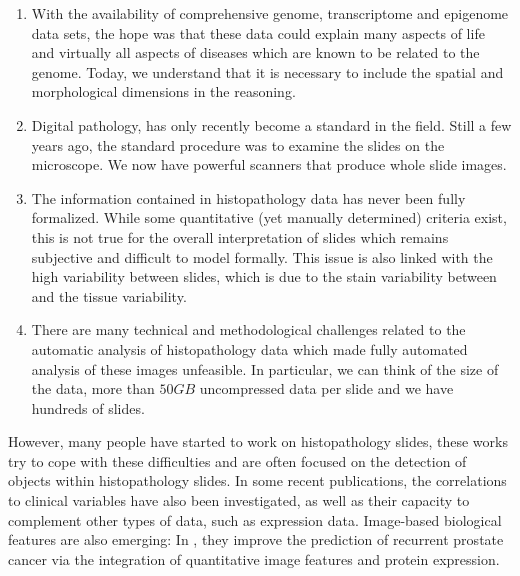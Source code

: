 \documentclass[a4paper,10pt,twocolumn]{article}
\begin{document}
\begin{enumerate}
\item With the
availability of comprehensive genome, transcriptome and epigenome data
sets, the hope was that these data could explain many aspects of life
and virtually all aspects of diseases which are known to be related to
the genome. Today, we understand that it is necessary to include the spatial and
morphological dimensions in the reasoning. 
\item Digital pathology,
has only recently become a standard in the field. Still a few years
ago, the standard
procedure was to examine the slides on the
microscope. We now have powerful scanners that produce whole slide images.
\item The information
contained in histopathology data has never been fully
formalized. While some quantitative (yet manually determined) criteria
exist, this is not true for the overall interpretation of slides
which remains subjective and difficult to model formally. This issue is also linked with the high variability between slides, which is due to the stain variability between and the tissue variability. 
\item There are many technical and methodological challenges related
  to the automatic analysis of histopathology data which made fully
  automated analysis of these images unfeasible. In particular, we can
  think of the size of the data, more than $50GB$ uncompressed data
  per slide and we have hundreds of slides. 
\end{enumerate}
However, many people have started to work on histopathology slides,
these works try to cope with these difficulties and are often focused
on the detection of objects within histopathology slides. In some
recent publications, the correlations to clinical variables have also
been investigated, as well as their capacity to complement other types of
data, such as expression data. Image-based biological features are
also emerging: In \citet{lee2015supervised},  they improve the
prediction of recurrent prostate cancer via the integration of
quantitative  image features and protein expression. 
\end{document}
